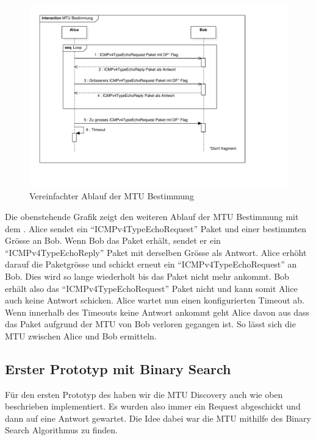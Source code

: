 \begin{figure}[H]
    \begin{center}
        \includegraphics[trim=30 80 140 20,clip,width=\textwidth]{mainpart/implementation/img/MTUBestimmungErfolgreich}
    \end{center}
    \caption{Vereinfachter Ablauf der MTU Bestimmung}
\end{figure}

Die obenstehende Grafik zeigt den weiteren Ablauf der \acs{MTU} Bestimmung mit dem \tool{}. Alice sendet ein \enquote{ICMPv4TypeEchoRequest} Paket und einer bestimmten Grösse an Bob. Wenn Bob das Paket erhält, sendet er ein \enquote{ICMPv4TypeEchoReply} Paket mit derselben Grösse als Antwort. Alice erhöht darauf die Paketgrösse und schickt erneut ein \enquote{ICMPv4TypeEchoRequest} an Bob. Dies wird so lange wiederholt bis das Paket nicht mehr ankommt. Bob erhält also das \enquote{ICMPv4TypeEchoRequest} Paket nicht und kann somit Alice auch keine Antwort schicken. Alice wartet nun einen konfigurierten Timeout ab. Wenn innerhalb des Timeouts keine Antwort ankommt geht Alice davon aus dass das Paket aufgrund der \ac{MTU} von Bob verloren gegangen ist. So lässt sich die \ac{MTU} zwischen Alice und Bob ermitteln.

\subsection{Erster Prototyp mit Binary Search}
Für den ersten Prototyp des \tool{} haben wir die \ac{MTU} Discovery auch wie oben beschrieben implementiert. Es wurden also immer ein Request abgeschickt und dann auf eine Antwort gewartet. Die Idee dabei war die \ac{MTU} mithilfe des Binary Search Algorithmus zu finden. 


